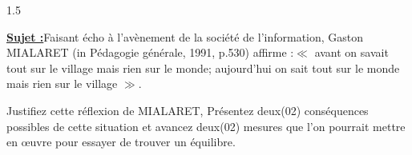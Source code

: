 \documentclass[12pt]{article}
\begin{document}
\begin{spacing}{1.5}

\textbf{\underline{Sujet :}}Faisant écho à l'avènement de la société de l'information, Gaston MIALARET (in Pédagogie générale, 1991, p.530) affirme :$\ll$ avant on savait tout sur le village mais rien sur le monde; aujourd'hui on sait tout sur le monde mais rien sur le village $\gg$.

Justifiez cette réflexion de MIALARET, Présentez deux(02) conséquences possibles de cette situation et avancez deux(02) mesures que l'on pourrait mettre en œuvre pour essayer de trouver un équilibre.


\quad

\end{spacing}
\end{document}
